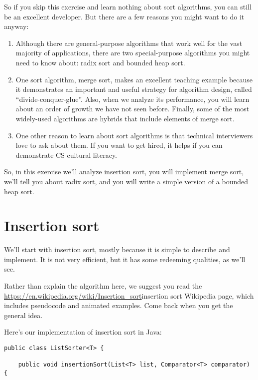 \documentclass[12pt]{book}
\theoremstyle{exercise}
\begin{document}
{So if you skip this exercise and learn nothing about sort algorithms, you can
still be an excellent developer. But there are a few reasons you might
want to do it anyway:

\begin{enumerate}
\def\labelenumi{\arabic{enumi}.}
\item
  Although there are general-purpose algorithms that work well for the
  vast majority of applications, there are two special-purpose
  algorithms you might need to know about: radix sort and bounded heap
  sort.
\item
  One sort algorithm, merge sort, makes an excellent teaching example
  because it demonstrates an important and useful strategy for algorithm
  design, called ``divide-conquer-glue''. Also, when we analyze its
  performance, you will learn about an order of growth we have not seen
  before. Finally, some of the most widely-used algorithms are hybrids
  that include elements of merge sort.
\item
  One other reason to learn about sort algorithms is that technical
  interviewers love to ask about them. If you want to get hired, it
  helps if you can demonstrate CS cultural literacy.
\end{enumerate}

So, in this exercise we'll analyze insertion sort, you will implement merge
sort, we'll tell you about radix sort, and you will write a simple
version of a bounded heap sort.

\section{Insertion sort}\label{insertion-sort}

We'll start with insertion sort, mostly because it is simple to describe
and implement. It is not very efficient, but it has some redeeming
qualities, as we'll see.

Rather than explain the algorithm here, we suggest you read the
\url{https://en.wikipedia.org/wiki/Insertion_sort}{insertion sort
Wikipedia page}, which includes pseudocode and animated examples. Come
back when you get the general idea.

Here's our implementation of insertion sort in Java:

\begin{verbatim}
public class ListSorter<T> {

    public void insertionSort(List<T> list, Comparator<T> comparator) {


\end{verbatim}}
\end{document}
